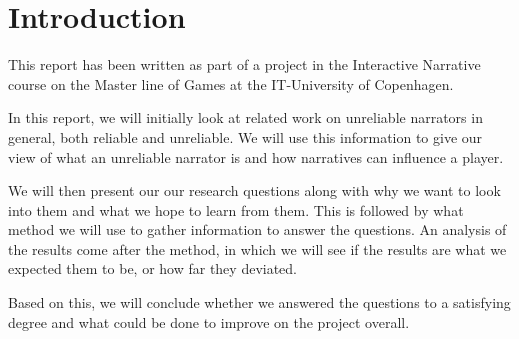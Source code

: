 \section{Introduction}
\label{Introduction}

This report has been written as part of a project in the Interactive Narrative course on the Master line of Games at the IT-University of Copenhagen.


In this report, we will initially look at related work on unreliable narrators in general, both reliable and unreliable. We will use this information to give our view of what an unreliable narrator is and how narratives can influence a player.

We will then present our our research questions along with why we want to look into them and what we hope to learn from them. This is followed by what method we will use to gather information to answer the questions. An analysis of the results come after the method, in which we will see if the results are what we expected them to be, or how far they deviated.

Based on this, we will conclude whether we answered the questions to a satisfying degree and what could be done to improve on the project overall.

%
%
%
%
